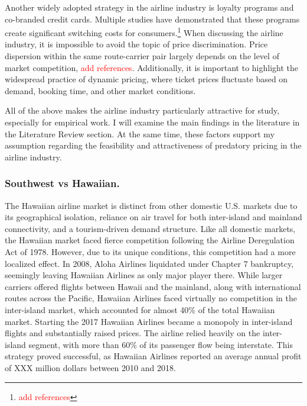 \documentclass[12pt,oneside]{article}
\theoremstyle{definition}
\theoremstyle{remark}
\begin{document}
Another widely adopted strategy in the airline industry is loyalty programs and co-branded credit cards. Multiple studies have demonstrated that these programs create significant switching costs for consumers.\footnote{\textcolor{red}{add references}} When discussing the airline industry, it is impossible to avoid the topic of price discrimination. Price dispersion within the same route-carrier pair largely depends on the level of market competition, \textcolor{red}{add references}. Additionally, it is important to highlight the widespread practice of dynamic pricing, where ticket prices fluctuate based on demand, booking time, and other market conditions.

All of the above makes the airline industry particularly attractive for study, especially for empirical work. I will examine the main findings in the literature in the Literature Review section. At the same time, these factors support my assumption regarding the feasibility and attractiveness of predatory pricing in the airline industry.



\subsubsection{Southwest vs Hawaiian.}

The Hawaiian airline market is distinct from other domestic U.S. markets due to its geographical isolation, reliance on air travel for both inter-island and mainland connectivity, and a tourism-driven demand structure. Like all domestic markets, the Hawaiian market faced fierce competition following the Airline Deregulation Act of 1978. However, due to its unique conditions, this competition had a more localized effect. In 2008, Aloha Airlines liquidated under Chapter 7 bankruptcy, seemingly leaving Hawaiian Airlines as only major player there. While larger carriers offered flights between Hawaii and the mainland, along with international routes across the Pacific, Hawaiian Airlines faced virtually no competition in the inter-island market, which accounted for almost 40\% of the total Hawaiian market. Starting the 2017 Hawaiian Airlines became a monopoly in inter-island flights and substantially raised prices. The airline relied heavily on the inter-island segment, with more than 60\% of its passenger flow being interstate. This strategy proved successful, as Hawaiian Airlines reported an average annual profit of XXX million dollars between 2010 and 2018.
 
\end{document}

